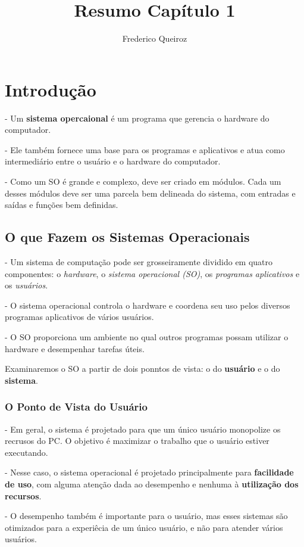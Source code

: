 \documentclass[a4paper, 11pt]{article}
\author{Frederico Queiroz}
\title{Resumo Capítulo 1}
\begin{document}
\maketitle

\section{Introdução}
- Um \textbf{sistema opercaional} é um programa que gerencia o hardware do computador.

- Ele também fornece uma base para os programas e aplicativos e atua como intermediário entre o usuário e o hardware do computador.

- Como um SO é grande e complexo, deve ser criado em módulos. %
Cada um desses módulos deve ser uma parcela bem delineada do sistema, com entradas e saídas e funções bem definidas.

\subsection{O que Fazem os Sistemas Operacionais}
- Um sistema de computação pode ser grosseiramente dividido em quatro componentes: %
o \textsl{hardware}, o \textsl{sistema operacional (SO)}, os \textsl{programas aplicativos} e os \textsl{usuários}.

- O sistema operacional controla o hardware e coordena seu uso pelos diversos programas aplicativos de vários usuários.

- O SO proporciona um ambiente no qual outros programas possam utilizar o hardware e desempenhar tarefas úteis. 

\vspace{0.5cm}
Examinaremos o SO a partir de dois ponntos de vista: o do \textbf{usuário} e o do \textbf{sistema}.

\subsubsection{O Ponto de Vista do Usuário}
- Em geral, o sistema é projetado para que um único usuário monopolize os recrusos do PC. %
O objetivo é maximizar o trabalho que o usuário estiver executando.

- Nesse caso, o sistema operacional é projetado principalmente para \textbf{facilidade de uso}, com alguma atenção dada ao desempenho e nenhuma à \textbf{utilização dos recursos}.

- O desempenho também é importante para o usuário, mas esses sistemas são otimizados para a experiêcia de um único usuário, e não para atender vários usuários.
\end{document}
